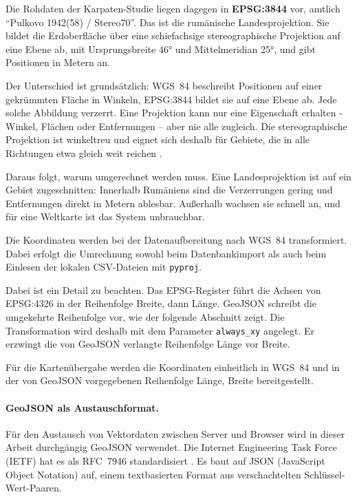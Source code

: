 \documentclass[12pt,a4paper]{report}
\begin{document}
Die Rohdaten der Karpaten-Studie liegen dagegen in \textbf{EPSG:3844} vor, amtlich
\enquote{Pulkovo 1942(58) / Stereo70}. Das ist die rumänische Landesprojektion. Sie bildet
die Erdoberfläche über eine schiefachsige stereographische Projektion auf eine Ebene ab,
mit Ursprungsbreite 46° und Mittelmeridian 25°, und gibt Positionen in Metern an.

Der Unterschied ist grundsätzlich: WGS~84 beschreibt Positionen auf einer gekrümmten
Fläche in Winkeln, EPSG:3844 bildet sie auf eine Ebene ab. Jede solche Abbildung verzerrt.
Eine Projektion kann nur eine Eigenschaft erhalten - Winkel, Flächen oder Entfernungen --
aber nie alle zugleich. Die stereographische Projektion ist winkeltreu und eignet sich
deshalb für Gebiete, die in alle Richtungen etwa gleich weit reichen \cite{Snyder1987}.

Daraus folgt, warum umgerechnet werden muss. Eine Landesprojektion ist auf ein Gebiet
zugeschnitten: Innerhalb Rumäniens sind die Verzerrungen gering und Entfernungen direkt in
Metern ablesbar. Außerhalb wachsen sie schnell an, und für eine Weltkarte ist das System
unbrauchbar.

Die Koordinaten werden bei der Datenaufbereitung nach WGS~84 transformiert.
Dabei erfolgt die Umrechnung sowohl beim Datenbankimport als auch beim Einlesen
der lokalen CSV-Dateien mit \texttt{pyproj}.

Dabei ist ein Detail zu beachten. Das EPSG-Register führt die Achsen von EPSG:4326 in der
Reihenfolge Breite, dann Länge. GeoJSON schreibt die umgekehrte Reihenfolge vor, wie der
folgende Abschnitt zeigt. Die Transformation wird deshalb mit dem Parameter
\texttt{always\_xy} angelegt. Er erzwingt die von GeoJSON verlangte Reihenfolge Länge vor
Breite.

Für die Kartenübergabe werden die Koordinaten einheitlich in WGS~84 und in der
von GeoJSON vorgegebenen Reihenfolge Länge, Breite bereitgestellt.

\paragraph{GeoJSON als Austauschformat.}
\label{subsec:geojson}

Für den Austausch von Vektordaten zwischen Server und Browser wird in dieser Arbeit
durchgängig GeoJSON verwendet. Die Internet Engineering Task Force (IETF) hat es als
RFC~7946 standardisiert \cite{RFC7946}. Es baut auf JSON (JavaScript Object Notation) auf,
einem textbasierten Format aus verschachtelten Schlüssel-Wert-Paaren.
\end{document}
